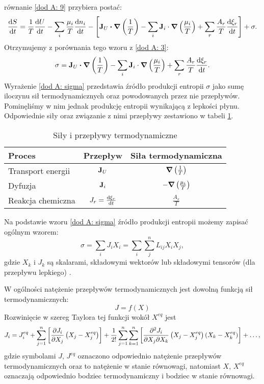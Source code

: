 \documentclass[10pt, a4paper, twoside, onecolumn]{article}
\numberwithin{equation}{section}
\begin{document}
	równanie \eqref{dod A: 9} przybiera postać:
	\begin{equation}
		\dv{S}{t}=\frac{1}{T}\dv{U}{t}-\sum_{i}\frac{\mu_{i}}{T}\dv{n_{i}}{t}-\left[\vb{J}_{U}\vdot\grad{\left(\frac{1}{T}\right)}-\sum_{i}\vb{J}_{i}\cdot\grad{\left(\frac{\mu_{i}}{T}\right)}+\sum_{r}\frac{A_{r}}{T}\dv{\xi_{r}}{t}\right]+\sigma.
	\end{equation}
	Otrzymujemy z porównania tego wzoru z \eqref{dod A: 3}:
	\begin{equation} \label{dod A: sigma}
		\sigma=\vb{J}_{U}\vdot\grad{\left(\frac{1}{T}\right)}-\sum_{i}\vb{J}_{i}\cdot\grad{\left(\frac{\mu_{i}}{T}\right)}+\sum_{r}\frac{A_{r}}{T}\dv{\xi_{r}}{t}.
	\end{equation}
	Wyrażenie \eqref{dod A: sigma} przedstawia źródło produkcji entropii $\sigma$ jako sumę iloczynu sił termodynamicznych oraz powodowanych przez nie przepływów. Pominęliśmy w nim jednak produkcję entropii wynikającą z lepkości płynu. Odpowiednie siły oraz związanie z nimi przepływy zestawiono w tabeli \ref{tab: sily i przeplywy}.
	\begin{table}[H]
	\centering
	\begin{tabular}{|l|c|c|}
		\hline
		Proces & Przepływ & Siła termodynamiczna \\
		\hline
		Transport energii & \(\vb{J}_{U}\) & \(\grad{\left(\frac{1}{T}\right)}\) \\
		Dyfuzja & \(\vb{J}_i\) & \(-\grad{\left(\frac{\mu_{i}}{T}\right)}\) \\
		Reakcja chemiczna & \(J_{r}=\dv{\xi_{r}}{t}\) & \(\frac{A_r}{T}\) \\
		\hline
	\end{tabular}
	\caption{Siły i przepływy termodynamiczne}
	\label{tab: sily i przeplywy}
	\end{table}\noindent
	Na podstawie wzoru \eqref{dod A: sigma} źródło produkcji entropii możemy zapisać ogólnym wzorem:
	\begin{equation}
		\sigma = \sum_{i}J_{i}X_{i} = \sum_{i}\sum_{j}^{n}L_{ij}X_{i}X_{j},
	\end{equation}
	gdzie $X_{k}$ i $J_{k}$ są skalarami, składowymi wektorów lub składowymi tensorów (dla przepływu lepkiego) \cite{guminski_petelenz}. 
	
	W ogólności natężenie przepływów termodynamicznych jest dowolną funkcją sił termodynamicznych: 
	\[J=f\left(X\right)\]
	Rozwinięcie w szereg Taylora tej funkcji wokół \(X^{eq}\) jest
	\begin{equation}\label{ogolne_natezenie}
		J_{i}=J_{i}^{eq}+\sum_{j=1}^{n}\left[\pdv{J_{i}}{X_{j}}\left(X_{j}-X_{j}^{eq}\right)\right]+\frac{1}{2!}\sum_{j=1}^{n}\sum_{k=1}^{n}\left[\pdv{J_{i}}{X_{j}}{X_{k}}\left(X_{j}-X_{j}^{eq}\right)\left(X_{k}-X_{k}^{eq}\right)\right]+\ldots,
	\end{equation}
	gdzie symbolami \(J\), \(J^{eq}\) oznaczono odpowiednio natężenie przepływów termodynamicznych oraz to natężenie w stanie równowagi, natomiast \(X\), \(X^{eq}\) oznaczają odpowiednio bodziec termodynamiczny i bodziec w stanie równowagi.
	
\end{document}
